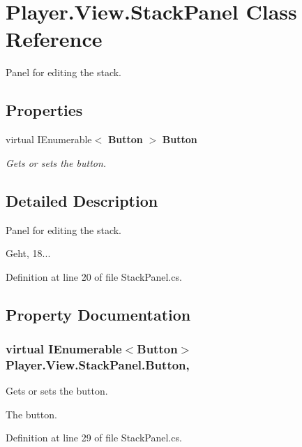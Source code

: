 \section{Player.\-View.\-Stack\-Panel Class Reference}
\label{class_player_1_1_view_1_1_stack_panel}


Panel for editing the stack.  


\subsection*{Properties}
\begin{DoxyCompactItemize}
\item 
virtual I\-Enumerable$<$ {\bf Button} $>$ {\bf Button}\hspace{0.3cm}{\ttfamily  [get, set]}
\begin{DoxyCompactList}\small\item\em Gets or sets the button. \end{DoxyCompactList}\end{DoxyCompactItemize}


\subsection{Detailed Description}
Panel for editing the stack. 

Geht, 18... 

Definition at line 20 of file Stack\-Panel.\-cs.



\subsection{Property Documentation}
\subsubsection[{Button}]{\setlength{\rightskip}{0pt plus 5cm}virtual I\-Enumerable$<${\bf Button}$>$ Player.\-View.\-Stack\-Panel.\-Button\hspace{0.3cm}{\ttfamily [get]}, {\ttfamily [set]}}\label{class_player_1_1_view_1_1_stack_panel_a728ee1e2f3dd3339866de5f8d4455365}


Gets or sets the button. 

The button. 

Definition at line 29 of file Stack\-Panel.\-cs.

